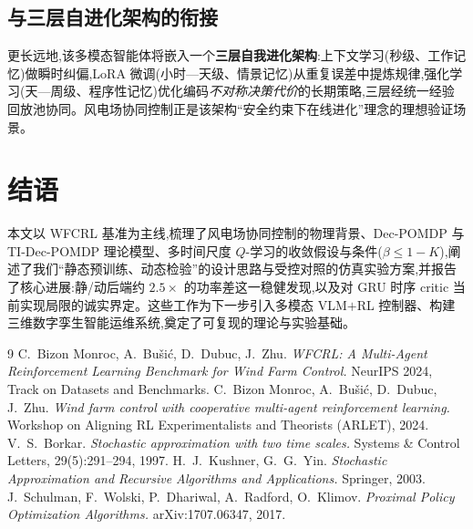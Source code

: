 \documentclass[12pt,a4paper]{article}
\theoremstyle{definition}
\theoremstyle{plain}
\begin{document}
\subsection{与三层自进化架构的衔接}

更长远地,该多模态智能体将嵌入一个\textbf{三层自我进化架构}:上下文学习(秒级、工作记忆)做瞬时纠偏,LoRA 微调(小时—天级、情景记忆)从重复误差中提炼规律,强化学习(天—周级、程序性记忆)优化编码\emph{不对称决策代价}的长期策略,三层经统一经验回放池协同。风电场协同控制正是该架构“安全约束下在线进化”理念的理想验证场景。

\section{结语}

本文以 WFCRL 基准为主线,梳理了风电场协同控制的物理背景、Dec-POMDP 与 TI-Dec-POMDP 理论模型、多时间尺度 $Q$-学习的收敛假设与条件($\beta\le1-K$),阐述了我们“静态预训练、动态检验”的设计思路与受控对照的仿真实验方案,并报告了核心进展:静/动后端约 $2.5\times$ 的功率差这一稳健发现,以及对 GRU 时序 critic 当前实现局限的诚实界定。这些工作为下一步引入多模态 VLM$+$RL 控制器、构建三维数字孪生智能运维系统,奠定了可复现的理论与实验基础。

\begin{thebibliography}{9}
 C.~Bizon Monroc, A.~Bu\v{s}i\'c, D.~Dubuc, J.~Zhu.
  \emph{WFCRL: A Multi-Agent Reinforcement Learning Benchmark for Wind Farm Control.}
  NeurIPS 2024, Track on Datasets and Benchmarks.
 C.~Bizon Monroc, A.~Bu\v{s}i\'c, D.~Dubuc, J.~Zhu.
  \emph{Wind farm control with cooperative multi-agent reinforcement learning.}
  Workshop on Aligning RL Experimentalists and Theorists (ARLET), 2024.
 V.~S.~Borkar.
  \emph{Stochastic approximation with two time scales.}
  Systems \& Control Letters, 29(5):291--294, 1997.
 H.~J.~Kushner, G.~G.~Yin.
  \emph{Stochastic Approximation and Recursive Algorithms and Applications.} Springer, 2003.
 J.~Schulman, F.~Wolski, P.~Dhariwal, A.~Radford, O.~Klimov.
  \emph{Proximal Policy Optimization Algorithms.} arXiv:1707.06347, 2017.
\end{thebibliography}
\end{document}
